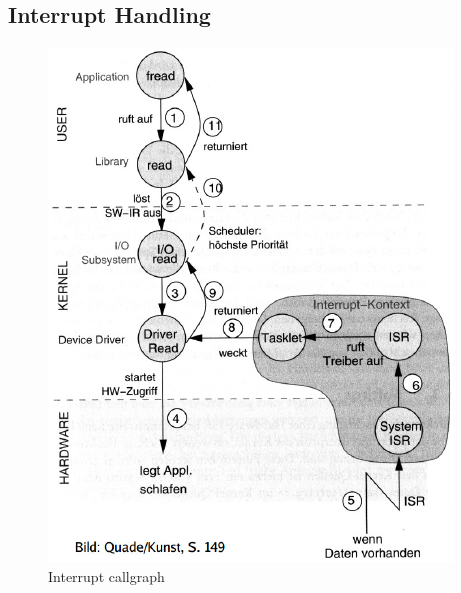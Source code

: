 \subsection{Interrupt Handling}
\begin{figure}[ht!]
    \includegraphics[scale=.8]{pics/isr}
    \caption{Interrupt callgraph}
\end{figure}